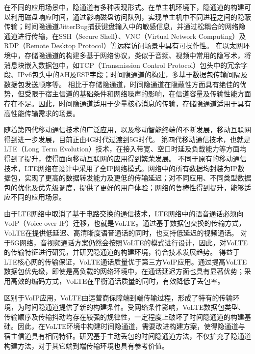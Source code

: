 在不同的应用场景中，隐通道有多种表现形式。在单主机环境下，隐通道的构建可以利用磁盘响应时间，通过影响磁盘访问队列，实现单主机中不同进程之间的隐蔽传输；时间隐通道JitterBug捕获键盘输入中的敏感信息，并通过松耦合的网络隐通道进行传输，在SSH（Secure Shell）、VNC（Virtual Network Computing）及RDP（Remote Desktop Protocol）等远程访问场景中具有可操作性。
在以太网环境中，存储隐通道的构建多基于网络协议，类似于音频、视频中常用的隐写术，将消息块嵌入数据包中，如TCP（Transmission Control Protocol）包头中的冗余字段、IPv6包头中的AH及ESP字段；时间隐通道的构建，多基于数据包传输间隔及数据包发送顺序等。
相比于存储隐通道，时间隐通道在隐蔽性方面具有绝佳的优势，但受限于宿主信道的基础条件和网络噪声的影响，在信道容量及传输性能方面存在不足。因此，时间隐通道适用于少量核心消息的传输，存储隐通道适用于具有高性能传输需求的场景。

随着第四代移动通信技术的广泛应用，以及移动智能终端的不断发展，移动互联网得到进一步发展，目前正由4G时代过渡到5G时代。
第四代移动通信技术，也就是LTE（Long Term Evolution）技术，在接入带宽、空口时延及负载能力等方面均得到了提升，使得面向移动互联网的应用得到繁荣发展。
不同于原有的移动通信技术，LTE网络在设计中采用了全IP网络模式。网络中的所有数据均封装为IP数据包，实现了更高的数据转发能力及更低的传输延迟；对不同应用、不同类型数据包的优化及优先级调度，提供了更好的用户体验；网络的鲁棒性得到提升，能够适应不同的应用场景。

由于LTE网络中取消了基于电路交换的通信技术，LTE网络中的语音通话必须向VoIP（Voice over IP）迁移，也就是VoLTE。通过基于数据包交换的传输方式，VoLTE在提供低延迟、高清晰度语音通话的同时，也支持低延迟的视频通话。
对于5G网络，音视频通话方案仍然会按照VoLTE的模式进行设计，因此，对VoLTE的传输特征进行研究，并研究隐通道的构建环境，符合技术发展趋势。
得益于LTE核心网的传输保证，VoLTE通话质量优于第三方VoIP应用。通过提高VoLTE数据包优先级，即使是高负载的网络环境中，在通话延迟方面也具有显著优势；采用高效的编码方式，VoLTE在平衡通话质量的同时，有效降低了丢包率。

区别于VoIP应用，VoLTE由运营商保障端到端传输过程，形成了特有的传输环境，为时间隐通道提供了新的构建条件。受网络条件影响，VoLTE数据包类型、传输顺序及传输抖动均存在较强的规律性，一定程度上破坏了时间隐通道的构建基础。因此，在VoLTE环境中构建时间隐通道，需要改进构建方案，使得隐通道与宿主信道具有相同特征。研究基于主动丢包的时间隐通道方法，不仅扩充了隐通道构建方法，对于其它端到端传输环境也具有参考价值。